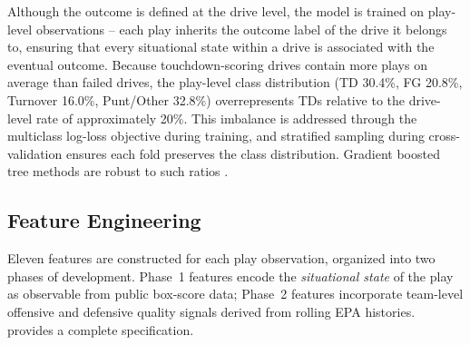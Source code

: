 Although the outcome is defined at the drive level, the model is trained on
play-level observations -- each play inherits the outcome label of the drive
it belongs to, ensuring that every situational state within a drive is
associated with the eventual outcome. Because touchdown-scoring drives contain
more plays on average than failed drives, the play-level class distribution
(TD 30.4\%, FG 20.8\%, Turnover 16.0\%, Punt/Other 32.8\%) overrepresents
TDs relative to the drive-level rate of approximately 20\%. This imbalance is
addressed through the multiclass log-loss objective during training, and
stratified sampling during cross-validation ensures each fold preserves the
class distribution. Gradient boosted tree methods are robust to such ratios
\parencite{chen2016xgboost}.

\subsection{Feature Engineering}

Eleven features are constructed for each play observation, organized into two
phases of development. Phase~1 features encode the \emph{situational state}
of the play as observable from public box-score data; Phase~2 features
incorporate team-level offensive and defensive quality signals derived from
rolling EPA histories.  provides a complete specification.

